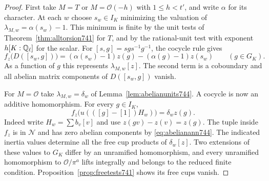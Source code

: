 \documentclass[a4paper,11pt]{article}
\theoremstyle{definition}
\theoremstyle{remark}
\numberwithin{equation}{section}
\begin{document}
\begin{proof}
First take \(M=T\) or \(M=\mathcal O(-h)\) with \(1\le h<t'\),
and write \(\alpha\) for its character. At each \(w\) choose
\(s_w\in I_K\) minimizing the valuation of
\(\lambda_{M,w}=\alpha(s_w)-1\). This minimum is finite by the
unit tests of Theorem~\ref{thm:alltorsion741} for \(T\), and by
the rational-unit test with exponent \(h[K:\mathbb Q_\ell]\) for the
scalar. For \([s,g]=sgs^{-1}g^{-1}\), the cocycle rule gives
\[
 f_z\bigl(D([s_w,g])\bigr)=
     (\alpha(s_w)-1)z(g)-(\alpha(g)-1)z(s_w)
                                  \qquad(g\in G_K).
\]
As a function of \(g\) this represents \(\lambda_{M,w}[z]\).
The second term is a coboundary and all abelian matrix components
of \(D([s_w,g])\) vanish.

For \(M=\mathcal O\) take \(\lambda_{M,w}=\delta_w\) of
Lemma~\ref{lem:abelianunits744}. A cocycle is now an additive
homomorphism. For every \(g\in I_K\),
\[
       f_z\bigl(u(([g]-[1])H_w)\bigr)=\delta_w z(g).
\]
Indeed write \(H_w=\sum b_v[v]\) and use
\(z(gv)-z(v)=z(g)\). The tuple inside \(f_z\) is in
\(\mathcal N\) and has zero abelian components by
\eqref{eq:abelianann744}. The indicated inertia values determine
all the free cup products of \(\delta_w[z]\). Two extensions of
these values to \(G_K\) differ by an unramified homomorphism,
and every unramified homomorphism to \(\mathcal O/\pi^a\)
lifts integrally and belongs to the reduced finite condition.
Proposition~\ref{prop:freetests741} shows its free cups vanish.


\end{proof}
\end{document}
